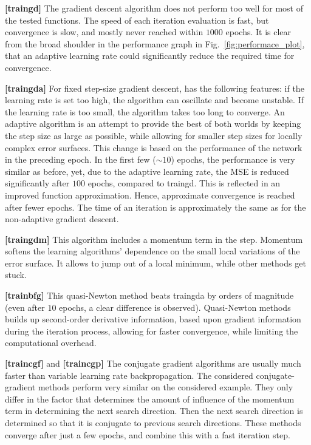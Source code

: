 \documentclass[pdftex,11pt,a4paper]{article}
\begin{document}
\textbf{[traingd]} The gradient descent algorithm does not perform too well for most of the tested functions. The speed of each iteration evaluation is fast, but convergence is slow, and mostly never reached within $1000$ epochs. It is clear from the broad shoulder in the performance graph in Fig.~\ref{fig:performace_plot}, that an adaptive learning rate could significantly reduce the required time for convergence.

\textbf{[traingda]} For fixed step-size gradient descent, has the following features: if the learning rate  is set too high, the algorithm can oscillate and become unstable. If the learning rate is too small, the algorithm takes too long to converge. An adaptive algorithm is an attempt to provide the best of both worlds by keeping the step size as large as possible, while allowing for smaller step sizes for locally complex error surfaces. This change is based on the performance of the network in the preceding epoch. 
In the first few ($\sim 10$) epochs, the performance is very similar as before, yet, due to the adaptive learning rate, the MSE is reduced significantly after $100$ epochs, compared to traingd. This is reflected in an improved function approximation. Hence, approximate convergence is reached after fewer epochs. The time of an iteration is approximately the same as for the non-adaptive gradient descent. 

\textbf{[traingdm]} This algorithm includes a momentum term in the step. Momentum softens the learning algorithms' dependence on the small local variations of the error surface. It allows to jump out of a local minimum, while other methods get stuck.

\textbf{[trainbfg]} This quasi-Newton method beats traingda by orders of magnitude (even after $10$ epochs, a clear difference is observed). Quasi-Newton methods builds up second-order derivative information, based upon gradient information during the iteration process, allowing for faster convergence, while limiting the computational overhead.

\textbf{[traincgf]} and \textbf{[traincgp]} The conjugate gradient algorithms are usually much faster than variable learning rate backpropagation. The considered conjugate-gradient methods perform very similar on the considered example. They only differ in the factor that determines the amount of influence of the momentum term in determining the next search direction. Then the next search direction is determined so that it is conjugate to previous search directions. These methods converge after just a few epochs, and combine this with a fast iteration step.
\end{document}
